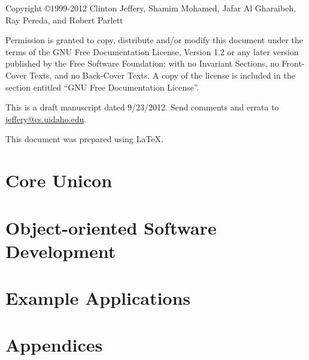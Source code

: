 \documentclass[letterpaper,twoside,12pt]{book}
\begin{document}
\thispagestyle{empty}
\bigskip
\bigskip
Copyright \copyright 1999-2012 Clinton Jeffery, Shamim Mohamed, Jafar Al Gharaibeh, Ray
Pereda, and Robert Parlett

Permission is granted to copy, distribute and/or modify this document under the
terms of the GNU Free Documentation License, Version 1.2 or any later version
published by the Free Software Foundation; with no Invariant Sections, no
Front-Cover Texts, and no Back-Cover Texts. A copy of the license is included in
the section entitled ``GNU Free Documentation License''.
\bigskip

This is a draft manuscript dated 9/23/2012.  Send comments and errata
to \href{mailto:jeffery@cs.uidaho.edu}{jeffery@cs.uidaho.edu}.

\bigskip
This document was prepared using \LaTeX.
\clearpage

\frontmatter
\setcounter{tocdepth}{2}
\tableofcontents


\mainmatter



\part{Core Unicon}











\part{Object-oriented Software Development}







\part{Example Applications}









\part{Appendices}
\appendix






% 

\backmatter


\small
\printindex
\end{document}
